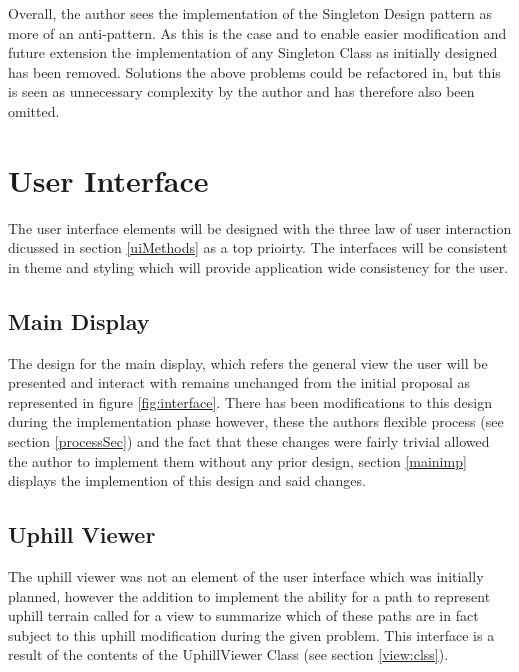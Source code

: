 Overall, the author sees the implementation of the Singleton Design pattern as more of an anti-pattern. As this is the case and to enable easier modification and future extension the implementation of any Singleton Class as initially designed has been removed. Solutions the above problems could be refactored in, but this is seen as unnecessary complexity by the author and has therefore also been omitted.

\section{User Interface}
\label{interfacebrah}
The user interface elements will be designed with the three law of user interaction dicussed in section \ref{uiMethods} as a top prioirty. The interfaces will be consistent in theme and styling which will provide application wide consistency for the user.

\subsection{Main Display}

The design for the main display, which refers the general view the user will be presented and interact with remains unchanged from the initial proposal as represented in figure \ref{fig:interface}. There has been modifications to this design during the implementation phase however, these the authors flexible process (see section \ref{processSec}) and the fact that these changes were fairly trivial allowed the author to implement them without any prior design, section \ref{mainimp} displays the implemention of this design and said changes.

\subsection{Uphill Viewer}
\label{uphillview}

The uphill viewer was not an element of the user interface which was initially planned, however the addition to implement the ability for a path to represent uphill terrain called for a view to summarize which of these paths are in fact subject to this uphill modification during the given problem. This interface is a result of the contents of the UphillViewer Class (see section \ref{view:clss}).

